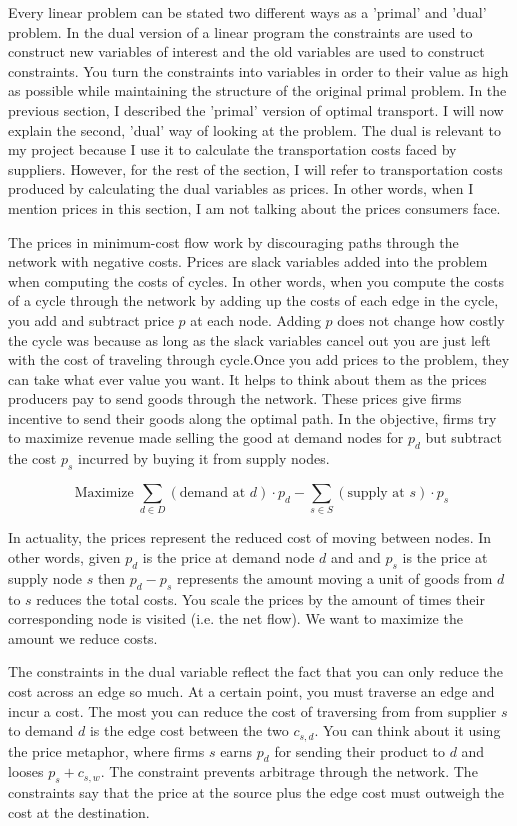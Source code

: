 \documentclass{report}
\begin{document}
Every linear problem can be stated two different ways as a 'primal' and 'dual' problem. In the dual version of a linear program the constraints are used to construct new variables of interest and the old variables are used to construct constraints. You turn the constraints into variables in order to their value as high as possible while maintaining the structure of the original primal problem. In the previous section, I described the 'primal' version of optimal transport. I will now explain the second, 'dual' way of looking at the problem. The dual is relevant to my project because I use it to calculate the transportation costs faced by suppliers. However, for the rest of the section, I will refer to transportation costs produced by calculating the dual variables as prices. In other words, when I mention prices in this section, I am not talking about the prices consumers face. 

The prices in minimum-cost flow work by discouraging paths through the network with negative costs. Prices are slack variables added into the problem when computing the costs of cycles. In other words, when you compute the costs of a cycle through the network by adding up the costs of each edge in the cycle, you add and subtract price $p$ at each node. Adding $p$ does not change how costly the cycle was because as long as the slack variables cancel out you are just left with the cost of traveling through cycle.Once you add prices to the problem, they can take what ever value you want. It helps to think about them as the prices producers pay to send goods through the network. These prices give firms incentive to send their goods along the optimal path. In the objective, firms try to maximize revenue made selling the good at demand nodes for $p_d$ but subtract the cost $p_s$ incurred by buying it from supply nodes. 

$$\operatorname{Maximize} \sum_{d \in D}  (\text{demand at } d) \cdot p_{d} -   \sum_{s \in S}  (\text{supply at } s) \cdot p_{s} $$

In actuality, the prices represent the reduced cost of moving between nodes. In other words, given $p_d$ is the price at demand node $d$ and and $p_s$ is the price at supply node $s$ then $p_d - p_s$ represents the amount moving a unit of goods from $d$ to $s$ reduces the total costs. You scale the prices by the amount of times their corresponding node is visited (i.e. the net flow). We want to maximize the amount we reduce costs. 

The constraints in the dual variable reflect the fact that you can only reduce the cost across an edge so much. At a certain point, you must traverse an edge and incur a cost. The most you can reduce the cost of traversing from from supplier $s$ to demand $d$ is the edge cost between the two $c_{s,d}$. You can think about it using the price metaphor, where firms $s$ earns $p_d$ for sending their product to $d$ and looses $p_s + c_{s,w}$. The constraint prevents arbitrage through the network.  The constraints say that the price at the source plus the edge cost must outweigh the cost at the destination.
\end{document}
